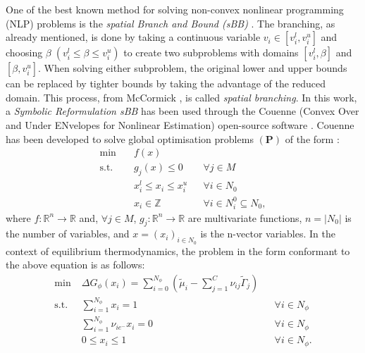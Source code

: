 One of the best known method for solving non-convex nonlinear programming (NLP) problems is the \emph{spatial Branch and Bound (sBB)} \cite{Smith:1996aa,Tawarmalani:2013aa}. The branching, as already mentioned, is done by taking a continuous variable $v_i \in \left[v_i^l , v_i^u \right]$ and choosing $\beta \; (v_i^l \leq \beta \leq v_i^u)$ to create two subproblems with domains $\left[v_i^l , \beta \right]$ and $\left[\beta , v_i^u \right]$. When solving either subproblem, the original lower and upper bounds can be replaced by tighter bounds by taking the advantage of the reduced domain. This process, from McCormick \cite{McCormick:1976aa}, is called \emph{spatial branching}.
In this work, a \emph{Symbolic Reformulation sBB} \cite{Smith:1996aa,Smith:1997ab,Smith:1999aa} has been used through the Couenne (Convex Over and Under ENvelopes for Nonlinear Estimation) open-source software \cite{Belotti:2009aa,Belotti:2022aa}. Couenne has been developed to solve global optimisation problems $(\mathbf{P})$  of the form \cite{Belotti:2009aa}:
\begin{equation} \label{eq:couenne_prob}
\begin{aligned}
	\min \quad &f(x)			& \\
	\text{s.t.} \quad &g_j(x) \leq 0  	& &\forall j \in M \\
	&x_i^l \leq x_i \leq x_i^u	& &\forall i \in N_0 \\
	& x_i \in \mathbb{Z}		& &\forall i \in N_i^0 \subseteq N_0,
\end{aligned}
\end{equation}
where $f : \mathbb{R}^n \rightarrow \mathbb{R}$ and, $\forall j \in M$, $g_j : \mathbb{R}^n \rightarrow \mathbb{R}$ are multivariate functions, $n = \left|N_0\right|$ is the number of variables, and $x = (x_i)_{i \in N_0}$ is the n-vector variables. In the context of equilibrium thermodynamics, the problem in the form conformant to the above equation is as follows:
\begin{equation}
\begin{aligned}
	\min \; & \Delta G_\phi(x_i) = \sum_{i=0}^{N_\phi} \left( \tilde{\mu}_i - \sum_{j=1}^{C} \nu_{ij}\tilde{\Gamma}_j \right)		& \\
	\text{s.t.} \; &\sum_{i=1}^{N_\phi} x_i = 1  	& &\forall i \in N_\phi \\
			&\sum_{i=1}^{N_\phi} \nu_{i{e^-}} x_i = 0 & &\forall i \in N_\phi \\
	&0 \leq x_i \leq 1	& & \forall i \in N_\phi.
\end{aligned}
\end{equation}
